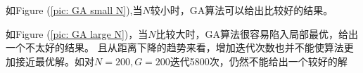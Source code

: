 \documentclass[12pt]{article}
\begin{document}
如Figure (\ref{pic: GA small N}),当$N$较小时，GA算法可以给出比较好的结果。

如Figure (\ref{pic: GA large N})，当$N$比较大时，GA算法很容易陷入局部最优，给出一个不太好的结果。
且从距离下降的趋势来看，增加迭代次数也并不能使算法更加接近最优解。如对$N=200,G=200$迭代5800次，仍然不能给出一个较好的解

\begin{figure}[H]
  \centering


\end{figure}
\end{document}
